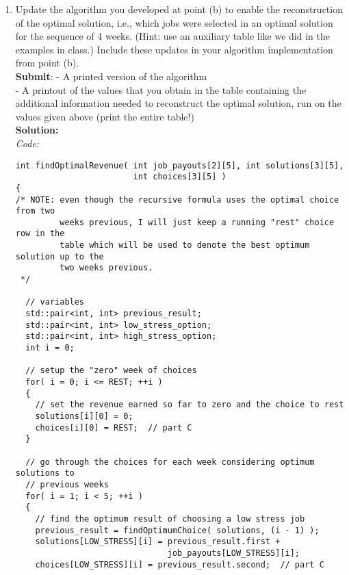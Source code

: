 \documentclass[11pts]{article}
\begin{document}
\begin{enumerate}
\begin{enumerate}
  \item Update the algorithm you developed at point (b) to enable the
        reconstruction of the optimal solution, i.e., which jobs were
        selected in an optimal solution for the sequence of 4 weeks.
        (Hint: use an auxiliary table like we did in the examples in class.)
        Include these updates in your algorithm implementation from
        point (b). \\

        \textbf{Submit}: 
        - A printed version of the algorithm \\ 
        - A printout of the values that you obtain in the table containing the additional 
        information needed to reconstruct the optimal solution, run on the values given 
        above (print the entire table!) \\


  \textbf{Solution:} \\
  \textit{Code:} \\
  \begin{verbatim}
int findOptimalRevenue( int job_payouts[2][5], int solutions[3][5],
                        int choices[3][5] )
{
/* NOTE: even though the recursive formula uses the optimal choice from two
         weeks previous, I will just keep a running "rest" choice row in the
         table which will be used to denote the best optimum solution up to the
         two weeks previous.
 */

  // variables
  std::pair<int, int> previous_result;
  std::pair<int, int> low_stress_option;
  std::pair<int, int> high_stress_option;
  int i = 0;

  // setup the "zero" week of choices
  for( i = 0; i <= REST; ++i )
  {
    // set the revenue earned so far to zero and the choice to rest
    solutions[i][0] = 0;
    choices[i][0] = REST;  // part C
  }

  // go through the choices for each week considering optimum solutions to
  // previous weeks
  for( i = 1; i < 5; ++i )
  {
    // find the optimum result of choosing a low stress job
    previous_result = findOptimumChoice( solutions, (i - 1) );
    solutions[LOW_STRESS][i] = previous_result.first +
                               job_payouts[LOW_STRESS][i];
    choices[LOW_STRESS][i] = previous_result.second;  // part C


\end{verbatim}
\end{enumerate}
\end{enumerate}
\end{document}
